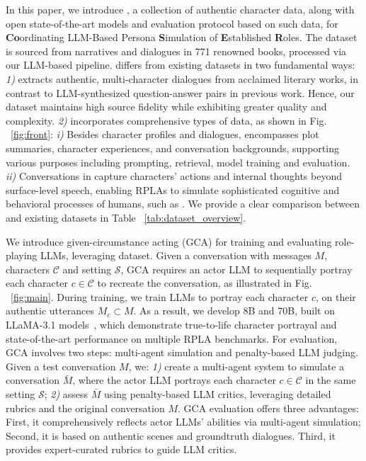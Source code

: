 In this paper, we introduce \method, a collection of authentic character data, along with open state-of-the-art models and evaluation protocol based on such data, for \textbf{Co}ordinating LLM-Based Persona \textbf{S}imulation of \textbf{E}stablished \textbf{R}oles. 
The \method dataset is sourced from narratives and dialogues in 771 renowned books, processed via our LLM-based pipeline. 
\method differs from existing datasets in two fundamental ways:  
\textit{1)} \method extracts authentic, multi-character dialogues from acclaimed literary works, 
in contrast to LLM-synthesized question-answer pairs in previous work. 
Hence, our dataset maintains high source fidelity while exhibiting greater quality and complexity. 
\textit{2)}  \method incorporates comprehensive types of data, as shown in Fig. ~\ref{fig:front}:  
\textit{i)}  Besides character profiles and dialogues, \method encompasses plot summaries, character experiences, and conversation backgrounds, supporting various purposes including prompting, retrieval, model training and evaluation. 
\textit{ii)}  Conversations in \method capture characters' actions and internal thoughts beyond surface-level speech, enabling RPLAs to simulate sophisticated cognitive and behavioral processes of humans, such as . 
We provide a clear comparison between \method and existing datasets in Table ~\ref{tab:dataset_overview}. 


We introduce given-circumstance acting (GCA) for training and evaluating role-playing LLMs, leveraging \method dataset. 
Given a conversation with messages $M$, characters $\mathcal{C}$ and setting $\mathcal{S}$, GCA requires an actor LLM to sequentially portray each character $c\in\mathcal{C}$ to recreate the conversation, as illustrated in Fig. ~\ref{fig:main}.
During training, we train LLMs to portray each character $c$, on their authentic utterances $M_c\subset M$. 
As a result, we develop \method 8B and 70B, built on LLaMA-3.1 models~\citep{dubey2024llama}, which demonstrate true-to-life character portrayal and state-of-the-art performance on multiple RPLA benchmarks. 
For evaluation, GCA involves two steps: multi-agent simulation and penalty-based LLM judging.
Given a test conversation $M$, we:
\textit{1)}  create a multi-agent system to simulate a  conversation $\bar{M}$, where the actor LLM portrays each character $c
\in\mathcal{C}$ in the same setting $\mathcal{S}$; 
\textit{2)}  assess $\bar{M}$ using penalty-based LLM critics, leveraging detailed rubrics and the original conversation $M$.  
GCA evaluation offers three advantages: 
First, it comprehensively reflects actor LLMs' abilities via multi-agent simulation;  
Second, it is based on authentic scenes and groundtruth dialogues. 
Third, it provides expert-curated rubrics to guide LLM critics.







